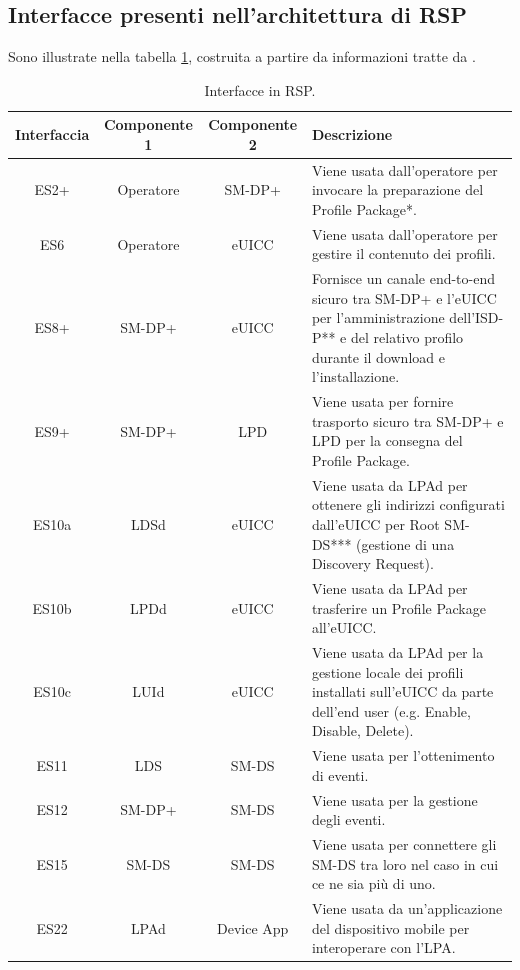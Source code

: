 \documentclass[10pt, oneside]{book}
\begin{document}
\subsection{Interfacce presenti nell'architettura di RSP}
Sono illustrate nella tabella \ref{tab:interfaces}, costruita a partire da informazioni tratte da \cite{GSMA-docs-new}.\\
\begin{table}[h!]
\begin{center}
\captionsetup{skip=4pt}
\caption{Interfacce in RSP.}
\label{tab:interfaces}
\begin{tabularx}{\textwidth}{|c|c|c|X|} %
\hline
\textbf{Interfaccia} & \textbf{Componente 1} & \textbf{Componente 2} & \textbf{Descrizione}\\
\hline
ES2+ & Operatore & SM-DP+ & Viene usata dall'operatore per invocare la preparazione del Profile Package*.\\
\hline
ES6 & Operatore & eUICC & Viene usata dall'operatore per gestire il contenuto dei profili.\\
\hline
ES8+ & SM-DP+ & eUICC & Fornisce un canale end-to-end sicuro tra SM-DP+ e l'eUICC per l'amministrazione dell'ISD-P** e del relativo profilo durante il download e l'installazione.\\
\hline
ES9+ & SM-DP+ & LPD & Viene usata per fornire trasporto sicuro tra SM-DP+ e LPD per la consegna del Profile Package.\\
\hline
ES10a & LDSd & eUICC & Viene usata da LPAd per ottenere gli indirizzi configurati dall'eUICC per Root SM-DS*** (gestione di una Discovery Request).\\
\hline
ES10b & LPDd & eUICC & Viene usata da LPAd per trasferire un Profile Package all'eUICC.\\
\hline
ES10c & LUId & eUICC & Viene usata da LPAd per la gestione locale dei profili installati sull'eUICC da parte dell'end user (e.g. Enable, Disable, Delete).\\
\hline
ES11 & LDS & SM-DS & Viene usata per l'ottenimento di eventi.\\
\hline
ES12 & SM-DP+ & SM-DS & Viene usata per la gestione degli eventi.\\
\hline
ES15 & SM-DS & SM-DS & Viene usata per connettere gli SM-DS tra loro nel caso in cui ce ne sia più di uno.\\
\hline
ES22 & LPAd & Device App & Viene usata da un'applicazione del dispositivo mobile per interoperare con l'LPA.\\

\end{tabularx}
\end{center}
\end{table}
\end{document}
